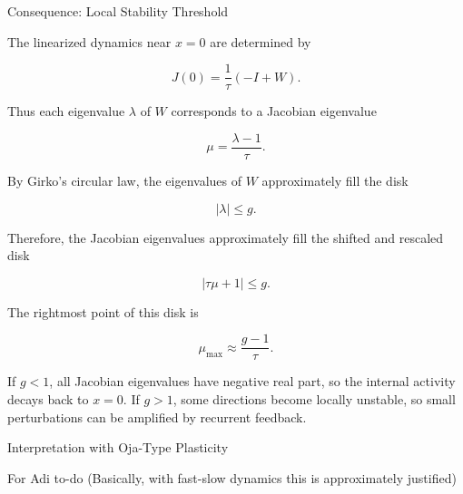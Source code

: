 \documentclass[
11pt,notheorems,hyperref={pdfauthor=whatever}
]{beamer}
\begin{document}
\begin{frame}{Consequence: Local Stability Threshold}
\small

The linearized dynamics near \(x=0\) are determined by

\[
J(0)=\frac{1}{\tau}(-I+W).
\]

Thus each eigenvalue \(\lambda\) of \(W\) corresponds to a Jacobian eigenvalue

\[
\mu
=
\frac{\lambda-1}{\tau}.
\]

By Girko's circular law, the eigenvalues of \(W\) approximately fill the disk

\[
|\lambda|\leq g.
\]

Therefore, the Jacobian eigenvalues approximately fill the shifted and rescaled disk

\[
\left|\tau \mu + 1\right| \leq g.
\]

The rightmost point of this disk is

\[
\mu_{\max}
\approx
\frac{g-1}{\tau}.
\]

If \(g<1\), all Jacobian eigenvalues have negative real part, so the internal
activity decays back to \(x=0\). If \(g>1\), some directions become locally
unstable, so small perturbations can be amplified by recurrent feedback.

\end{frame}

\begin{frame}{Interpretation with Oja-Type Plasticity}

For Adi to-do (Basically, with fast-slow dynamics this is approximately justified)

\end{frame}
\end{document}
